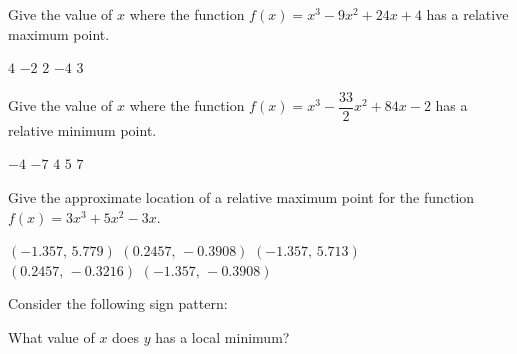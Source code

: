 \begin{questions}
    \question Give the value of $x$ where the function $f(x) = x^3 - 9x^2 + 24x + 4$ has a relative maximum point. \\

    \begin{oneparchoices}
        \choice $4$
        \choice $-2$
        \choice $2$
        \choice $-4$
        \choice $3$
    \end{oneparchoices} \par \horizontalline

    \question Give the value of $x$ where the function $f(x) = x^3 - \dfrac{33}{2}x^2 + 84x - 2$ has a relative minimum point. \\

    \begin{oneparchoices}
        \choice $-4$
        \choice $-7$
        \choice $4$
        \choice $5$
        \choice $7$
    \end{oneparchoices} \par \horizontalline

    \question Give the approximate location of a relative maximum point for the function $f(x) = 3x^3 + 5x^2 - 3x$. \\

    \begin{oneparchoices}
        \choice $(-1.357, \, 5.779)$
        \choice $(0.2457, \, -0.3908)$
        \choice $(-1.357, \, 5.713)$ \\[11pt]
        \makebox[0.2\textwidth] \choice $(0.2457, \, -0.3216)$
        \makebox[0.2\textwidth] \choice $(-1.357, \, -0.3908)$
    \end{oneparchoices} \par \horizontalline

    \question Consider the following sign pattern: \\
    \begin{center}
    \end{center}
    What value of $x$ does $y$ has a local minimum? \\


\end{questions}

